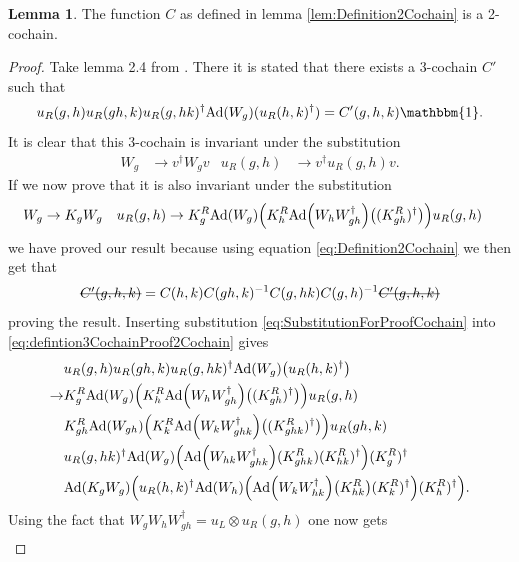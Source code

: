 \documentclass[12pt,a4paper,twoside]{article}
\newcommand{\stkout}[1]{\ifmmode\text{\sout{\ensuremath{#1}}}\else\sout{#1}\fi}
\let\originalleft\left
\let\originalright\right
\renewcommand{\left}{\mathopen{}\mathclose\bgroup\originalleft}
\renewcommand{\right}{\aftergroup\egroup\originalright}
\newcommand{\id}{\mathbbm{1}}
\newcommand{\Ad}[1]{\textrm{Ad}\left(#1\right)}
\theoremstyle{definition}
\newtheorem{lemma}[theorem]{Lemma}
\numberwithin{equation}{section}
\begin{document}
\begin{lemma}
	The function $C$ as defined in lemma \ref{lem:Definition2Cochain} is a 2-cochain.
\end{lemma}
\begin{proof}
	Take lemma 2.4 from \cite{ogata2021h3gmathbb}. There it is stated that there exists a 3-cochain $C'$ such that
	\begin{equation}\label{eq:defintion3CochainProof2Cochain}
		u_R(g,h)u_R(gh,k)u_R(g,hk)^\dagger\Ad{W_g}(u_R(h,k)^\dagger)=C'(g,h,k)\id.
	\end{equation}
	It is clear that this 3-cochain is invariant under the substitution
	\begin{align}
		W_g&\rightarrow v^\dagger W_g v&u_R(g,h)&\rightarrow v^\dagger u_R(g,h)v.
	\end{align}
	If we now prove that it is also invariant under the substitution
	\begin{align}\label{eq:SubstitutionForProofCochain}
		W_g&\rightarrow K_g W_g&u_R(g,h)&\rightarrow K_g^R\Ad{W_g}\left(K_h^R\Ad{W_hW_{gh}^\dagger}\left((K_{gh}^R)^\dagger\right)\right)u_
		R(g,h)
	\end{align}
	we have proved our result because using equation \eqref{eq:Definition2Cochain} we then get that
	\begin{equation}
		\stkout{C'(g,h,k)}=C(h,k)C(gh,k)^{-1}C(g,hk)C(g,h)^{-1}\stkout{C'(g,h,k)}
	\end{equation}
	proving the result. Inserting substitution \eqref{eq:SubstitutionForProofCochain} into \eqref{eq:defintion3CochainProof2Cochain} gives
	\begin{align}
		&u_R(g,h)u_R(gh,k)u_R(g,hk)^\dagger\Ad{W_g}\left(u_R(h,k)^\dagger\right)\\
		\rightarrow&K_g^R\Ad{W_g}\left(K_h^R\Ad{W_hW_{gh}^\dagger}\left((K_{gh}^R)^\dagger\right)\right)u_
		R(g,h)\\
		\nonumber
		&K_{gh}^R\Ad{W_{gh}}\left(K_k^R\Ad{W_kW_{ghk}^\dagger}\left((K_{ghk}^R)^\dagger\right)\right)u_
		R(gh,k)\\
		\nonumber
		&u_R(g,hk)^\dagger \Ad{W_g}\left( \Ad{W_{hk}W_{ghk}^\dagger}(K^R_{ghk})(K^R_{hk})^{\dagger} \right)(K^R_g)^\dagger\\
		\nonumber
		&\Ad{K_gW_g}\left(u_R(h,k)^\dagger \Ad{W_h}\left(\Ad{W_kW_{hk}^\dagger}\left(K_{hk}^R\right)(K^R_k)^\dagger\right)(K^R_h)^\dagger\right).
	\end{align}
	Using the fact that $W_gW_hW_{gh}^\dagger=u_L\otimes u_R(g,h)$ one now gets
	\begin{align}

\end{align}
\end{proof}
\end{document}
